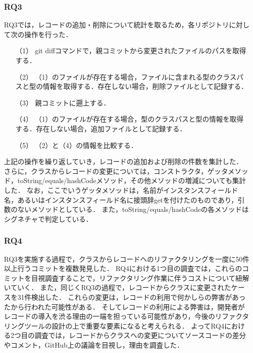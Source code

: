 \subsubsection{RQ3\label{rq3_method}}
RQ3では，レコードの追加・削除について統計を取るため，各リポジトリに対して次の操作を行った．
\begin{itemize}
    \item[（1） ] git diffコマンドで，親コミットから変更されたファイルのパスを取得する．
    \item[（2） ] （1）のファイルが存在する場合，ファイルに含まれる型のクラスパスと型の情報を取得する．存在しない場合，削除ファイルとして記録する．
    \item[（3） ] 親コミットに遡上する．
    \item[（4） ] （1）のファイルが存在する場合，型のクラスパスと型の情報を取得する．存在しない場合，追加ファイルとして記録する．
    \item[（5） ] （2）と（4）の情報を比較する．
\end{itemize}
上記の操作を繰り返していき，レコードの追加および削除の件数を集計した．
さらに，クラスからレコードの変更については，コンストラクタ，ゲッタメソッド，toString/equals/hashCodeメソッド，その他メソッドの増減についても集計した．
なお，ここでいうゲッタメソッドは，名前がインスタンスフィールド名，あるいはインスタンスフィールド名に接頭辞getを付けたのものであり，引数のないメソッドとしている．
また，toString/equals/hashCodeの各メソッドはシグネチャで判定している．

\subsubsection{RQ4\label{rq4_method}}
RQ3を実施する過程で，クラスからレコードへのリファクタリングを一度に50件以上行うコミットを複数発見した．
RQ4における1つ目の調査では，これらのコミットを目視調査することで，リファクタリング作業に伴うコストについて紐解いていく．
また，同じくRQ3の過程で，レコードからクラスに変更されたケースを31件検出した．
これらの変更は，レコードの利用で何かしらの弊害があったから行われた可能性がある．
そしてレコードの利用による弊害は，開発者がレコードの導入を渋る理由の一端を担っている可能性があり，今後のリファクタリングツールの設計の上で重要な要素になると考えられる．
よってRQ4における2つ目の調査では，レコードからクラスへの変更についてソースコードの差分やコメント，GitHub上の議論を目視し，理由を調査した．